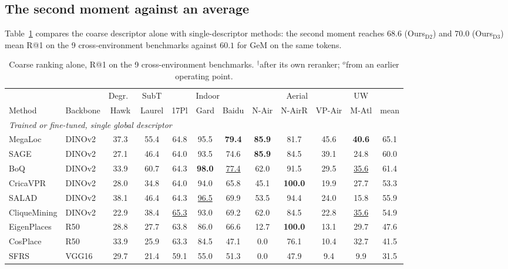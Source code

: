 \subsection{The second moment against an average}
\label{app:coarsegrid}
Table~\ref{tab:coarse} compares the coarse descriptor alone with single-descriptor methods: the second moment reaches $68.6$ (Ours$_{\mathrm{D2}}$) and $70.0$ (Ours$_{\mathrm{D3}}$) mean R@1 on the 9 cross-environment benchmarks against $60.1$ for GeM on the same tokens.
\begin{table}[H]
\caption{Coarse ranking alone, R@1 on the 9 cross-environment benchmarks. $^{\dagger}$after its own reranker; $^{o}$from an earlier operating point.}
\label{tab:coarse}
\centering
{\scriptsize\setlength{\tabcolsep}{1.8pt}\renewcommand{\arraystretch}{0.86}%
\begin{tabular}{llccccccccc|c}
\toprule
& & Degr.\ & SubT & \multicolumn{3}{c}{Indoor} & \multicolumn{3}{c}{Aerial} & UW & \\
\cmidrule(lr){3-11}
Method   &   Backbone   &   Hawk   &   Laurel   &  17Pl &   Gard   &   Baidu   &   N-Air   &   N-AirR   &   VP-Air   & M-Atl &   mean \\
\midrule
\multicolumn{12}{l}{\emph{Trained or fine-tuned, single global descriptor}} \\
MegaLoc & DINOv2 & 37.3 & 55.4 & 64.8 & 95.5 & \textbf{79.4} & \textbf{85.9} & 81.7 & 45.6 & \textbf{40.6} & 65.1 \\
SAGE & DINOv2 & 27.1 & 46.4 & 64.0 & 93.5 & 74.6 & \textbf{85.9} & 84.5 & 39.1 & 24.8 & 60.0 \\
BoQ & DINOv2 & 33.9 & 60.7 & 64.3 & \textbf{98.0} & \underline{77.4} & 62.0 & 91.5 & 29.5 & \underline{35.6} & 61.4 \\
CricaVPR & DINOv2 & 28.0 & 34.8 & 64.0 & 94.0 & 65.8 & 45.1 & \textbf{100.0} & 19.9 & 27.7 & 53.3 \\
SALAD & DINOv2 & 38.1 & 46.4 & 64.3 & \underline{96.5} & 69.9 & 53.5 & 94.4 & 24.0 & 15.8 & 55.9 \\
CliqueMining & DINOv2 & 22.9 & 38.4 & \underline{65.3} & 93.0 & 69.2 & 62.0 & 84.5 & 22.8 & \underline{35.6} & 54.9 \\
EigenPlaces & R50 & 28.8 & 27.7 & 63.8 & 86.0 & 66.6 & 12.7 & \textbf{100.0} & 13.1 & 29.7 & 47.6 \\
CosPlace & R50 & 33.9 & 25.9 & 63.3 & 84.5 & 47.1 & 0.0 & 76.1 & 10.4 & 32.7 & 41.5 \\
SFRS & VGG16 & 29.7 & 21.4 & 59.1 & 55.0 & 51.3 & 0.0 & 47.9 & 9.4 & 9.9 & 31.5 \\

\end{tabular}}
\end{table}
